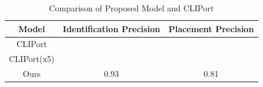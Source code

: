 


\begin{table}
    \centering
    \caption{Comparison of Proposed Model and CLIPort}
    \begin{tabular}{|c|c|c|}
         \hline 
         Model  & Identification Precision & Placement Precision \\ 
         \hline
          CLIPort &  &    \\
          \hline
         CLIPort(x5) &  & \\ 
         \hline 
         Ours    & 0.93 & 0.81 \\
        \hline 
    \end{tabular}
    \label{tab:accuracy}
\end{table} 
